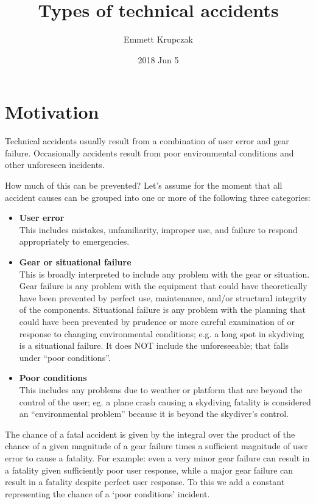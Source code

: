 \documentclass[11pt]{amsart}
\title{Types of technical accidents}
\author{Emmett Krupczak}
\date{2018 Jun 5}                                           %
\begin{document}
\maketitle
\section{Motivation}
Technical accidents usually result from a combination of user error and gear failure. Occasionally accidents result from poor environmental conditions and other unforeseen incidents. 

How much of this can be prevented? Let's assume for the moment that all accident causes can be grouped into one or more of the following three categories:
\begin{itemize}
\item \textbf{User error}\\
This includes mistakes, unfamiliarity, improper use, and failure to respond appropriately to emergencies. 
\item \textbf{Gear or situational failure} \\
This is broadly interpreted to include any problem with the gear or situation. Gear failure is any problem with the equipment that could have theoretically have been prevented by perfect use, maintenance, and/or structural integrity of the components. Situational failure is any problem with the planning that could have been prevented by prudence or more careful examination of or response to changing environmental conditions; e.g. a long spot in skydiving is a situational failure. It does NOT include the unforeseeable; that falls under ``poor conditions''. 

\item \textbf{Poor conditions} \\
This includes any problems due to weather or platform that are beyond the control of the user; eg. a plane crash causing a skydiving fatality is considered an ``environmental problem'' because it is beyond the skydiver's control.
\end{itemize}

The chance of a fatal accident is given by the integral over the product of the chance of a given magnitude of a gear failure times a sufficient magnitude of user error to cause a fatality. For example: even a very minor gear failure can result in a fatality given sufficiently poor user response, while a major gear failure can result in a fatality despite perfect user response. 
To this we add a constant representing the chance of a `poor conditions' incident.
\end{document}
